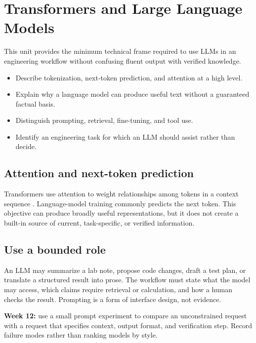 \chapter{Transformers and Large Language Models}\label{chap:llm}
 This unit provides the minimum technical frame required to use LLMs in an engineering workflow without confusing fluent output with verified knowledge.

\begin{learningbox}
\begin{itemize}
  \item Describe tokenization, next-token prediction, and attention at a high level.
  \item Explain why a language model can produce useful text without a guaranteed factual basis.
  \item Distinguish prompting, retrieval, fine-tuning, and tool use.
  \item Identify an engineering task for which an LLM should assist rather than decide.
\end{itemize}
\end{learningbox}

\section{Attention and next-token prediction}
Transformers use attention to weight relationships among tokens in a context sequence \citep{vaswani2017}. Language-model training commonly predicts the next token. This objective can produce broadly useful representations, but it does not create a built-in source of current, task-specific, or verified information.

\section{Use a bounded role}
An LLM may summarize a lab note, propose code changes, draft a test plan, or translate a structured result into prose. The workflow must state what the model may access, which claims require retrieval or calculation, and how a human checks the result. Prompting is a form of interface design, not evidence.

\begin{labbox}
\textbf{Week 12:} use a small prompt experiment to compare an unconstrained request with a request that specifies context, output format, and verification step. Record failure modes rather than ranking models by style.
\end{labbox}
